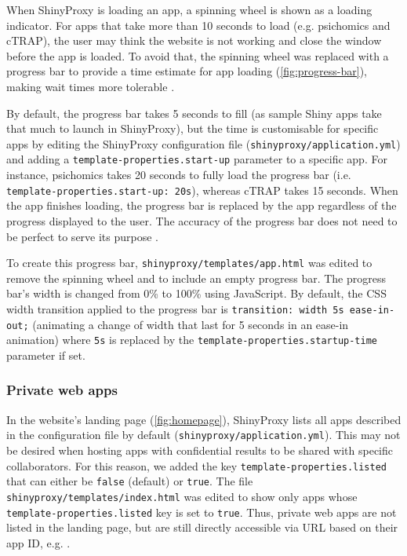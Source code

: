 When ShinyProxy is loading an app, a spinning wheel is shown as a loading indicator. For apps that take more than 10 seconds to load (e.g. psichomics and cTRAP), the user may think the website is not working and close the window before the app is loaded. To avoid that, the spinning wheel was replaced with a progress bar to provide a time estimate for app loading (\autoref{fig:progress-bar}), making wait times more tolerable \cite{myers:1985aa,yablonski:2020ts}.

By default, the progress bar takes 5 seconds to fill (as sample Shiny apps take that much to launch in ShinyProxy), but the time is customisable for specific apps by editing the ShinyProxy configuration file (\texttt{shinyproxy/application.yml}) and adding a \texttt{template-properties.start-up} parameter to a specific app. For instance, psichomics takes 20 seconds to fully load the progress bar (i.e. \texttt{template-properties.start-up: 20s}), whereas cTRAP takes 15 seconds. When the app finishes loading, the progress bar is replaced by the app regardless of the progress displayed to the user. The accuracy of the progress bar does not need to be perfect to serve its purpose \cite{myers:1985aa,yablonski:2020ts}.

To create this progress bar, \verb|shinyproxy/templates/app.html| was edited to remove the spinning wheel and to include an empty progress bar. The progress bar's width is changed from 0\% to 100\% using JavaScript. By default, the CSS width transition applied to the progress bar is \texttt{transition: width 5s ease-in-out;} (animating a change of width that last for 5 seconds in an ease-in animation) where \texttt{5s} is replaced by the \texttt{template-properties.startup-time} parameter if set.



\subsubsection{Private web apps}

In the website's landing page (\autoref{fig:homepage}), ShinyProxy lists all apps described in the configuration file by default (\texttt{shinyproxy/application.yml}). This may not be desired when hosting apps with confidential results to be shared with specific collaborators. For this reason, we added the key \texttt{template-properties.listed} that can either be \texttt{false} (default) or \texttt{true}. The file \texttt{shinyproxy/templates/index.html} was edited to show only apps whose \texttt{template-properties.listed} key is set to \texttt{true}. Thus, private web apps are not listed in the landing page, but are still directly accessible via URL based on their app ID, e.g. .

